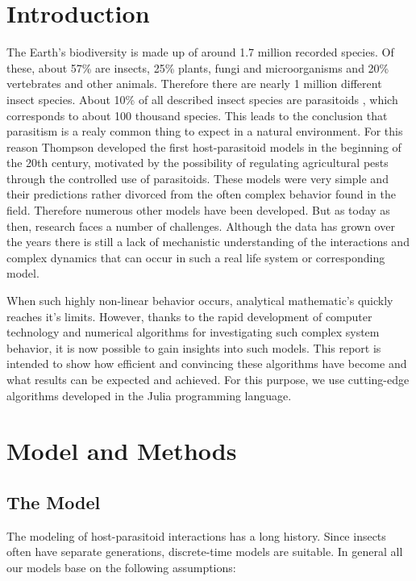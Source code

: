 \documentclass[a4paper,12pt, twoside]{article} %
\begin{document}
\section{Introduction}
The Earth's biodiversity is made up of around 1.7 million recorded species. Of these, about 57\% are insects, 25\% plants, 
fungi and microorganisms and 20\% vertebrates and other animals. Therefore there are nearly 1 million different insect species. \autocite[S. 35ff]{biodiversity}
About 10\% of all described insect species are parasitoids \autocite{eggleton1997}, 
which corresponds to about 100 thousand species. This leads to the conclusion that parasitism is a realy common thing to expect in a natural
environment. For this reason Thompson developed the first host-parasitoid models in the beginning of the 20th century, motivated by the possibility 
of regulating agricultural pests through the controlled use of parasitoids. These models were very simple and their predictions rather divorced
from the often complex behavior found in the field. Therefore numerous other models have been developed. But as today as then, research faces a number 
of challenges. Although the data has grown over the years there is still a lack of mechanistic understanding of the interactions 
and complex dynamics that can occur in such a real life system or corresponding model. 
 
When such highly non-linear behavior occurs, analytical mathematic's quickly reaches it's limits. 
However, thanks to the rapid development of computer technology and numerical algorithms for investigating such complex system behavior, it is now 
possible to gain insights into such models. This report is intended to show how efficient and convincing these algorithms have become 
and what results can be expected and achieved. For this purpose, we use cutting-edge algorithms developed in the Julia programming language.


\section{Model and Methods}

\subsection{The Model}
The modeling of host-parasitoid interactions has a long history. Since insects often have separate generations, 
discrete-time models are suitable. In general all our models base on the following assumptions:
\end{document}
